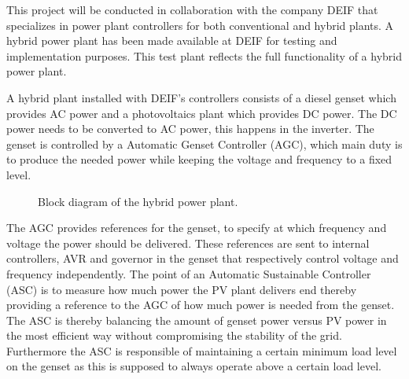 This project will be conducted in collaboration with the company DEIF that specializes in power plant controllers for both conventional and hybrid plants. A hybrid power plant has been made available at DEIF for testing and implementation purposes. This test plant reflects the full functionality of a hybrid power plant.

A hybrid plant installed with DEIF's controllers consists of a diesel genset which provides AC power and a photovoltaics plant which provides DC power. The DC power needs to be converted to AC power, this happens in the inverter. The genset is controlled by a Automatic Genset Controller (AGC), which main duty is to produce the needed power while keeping the voltage and frequency to a fixed level.


\begin{figure}[H]
\centering

\caption{Block diagram of the hybrid power plant.}
\label{fig:overall_diagram}
\end{figure}
%

The AGC provides references for the genset, to specify at which frequency and voltage the power should be delivered. These references are sent to internal controllers, AVR and governor in the genset that respectively control voltage and frequency independently. The point of an Automatic Sustainable Controller (ASC) is to measure how much power the PV plant delivers end thereby providing a reference to the AGC of how much power is needed from the genset. The ASC is thereby balancing the amount of genset power versus PV power in the most efficient way without compromising the stability of the grid. Furthermore the ASC is responsible of maintaining a certain minimum load level on the genset as this is supposed to always operate above a certain load level.    


